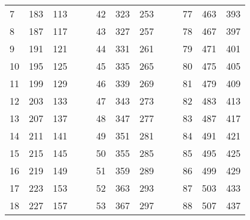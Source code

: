 \begin{table}[!h]
\begin{tabular}{|l|l|l|ll|l|l|l|lllll}
		7 & 183 & 113 &  &  & 42 & 323 & 253 &  & \multicolumn{1}{l|}{} & \multicolumn{1}{l|}{77} & \multicolumn{1}{l|}{463} & \multicolumn{1}{l|}{393} \\ \cline{1-3} \cline{6-8} \cline{11-13} 
		8 & 187 & 117 &  &  & 43 & 327 & 257 &  & \multicolumn{1}{l|}{} & \multicolumn{1}{l|}{78} & \multicolumn{1}{l|}{467} & \multicolumn{1}{l|}{397} \\ \cline{1-3} \cline{6-8} \cline{11-13} 
		9 & 191 & 121 &  &  & 44 & 331 & 261 &  & \multicolumn{1}{l|}{} & \multicolumn{1}{l|}{79} & \multicolumn{1}{l|}{471} & \multicolumn{1}{l|}{401} \\ \cline{1-3} \cline{6-8} \cline{11-13} 
		10 & 195 & 125 &  &  & 45 & 335 & 265 &  & \multicolumn{1}{l|}{} & \multicolumn{1}{l|}{80} & \multicolumn{1}{l|}{475} & \multicolumn{1}{l|}{405} \\ \cline{1-3} \cline{6-8} \cline{11-13} 
		11 & 199 & 129 &  &  & 46 & 339 & 269 &  & \multicolumn{1}{l|}{} & \multicolumn{1}{l|}{81} & \multicolumn{1}{l|}{479} & \multicolumn{1}{l|}{409} \\ \cline{1-3} \cline{6-8} \cline{11-13} 
		12 & 203 & 133 &  &  & 47 & 343 & 273 &  & \multicolumn{1}{l|}{} & \multicolumn{1}{l|}{82} & \multicolumn{1}{l|}{483} & \multicolumn{1}{l|}{413} \\ \cline{1-3} \cline{6-8} \cline{11-13} 
		13 & 207 & 137 &  &  & 48 & 347 & 277 &  & \multicolumn{1}{l|}{} & \multicolumn{1}{l|}{83} & \multicolumn{1}{l|}{487} & \multicolumn{1}{l|}{417} \\ \cline{1-3} \cline{6-8} \cline{11-13} 
		14 & 211 & 141 &  &  & 49 & 351 & 281 &  & \multicolumn{1}{l|}{} & \multicolumn{1}{l|}{84} & \multicolumn{1}{l|}{491} & \multicolumn{1}{l|}{421} \\ \cline{1-3} \cline{6-8} \cline{11-13} 
		15 & 215 & 145 &  &  & 50 & 355 & 285 &  & \multicolumn{1}{l|}{} & \multicolumn{1}{l|}{85} & \multicolumn{1}{l|}{495} & \multicolumn{1}{l|}{425} \\ \cline{1-3} \cline{6-8} \cline{11-13} 
		16 & 219 & 149 &  &  & 51 & 359 & 289 &  & \multicolumn{1}{l|}{} & \multicolumn{1}{l|}{86} & \multicolumn{1}{l|}{499} & \multicolumn{1}{l|}{429} \\ \cline{1-3} \cline{6-8} \cline{11-13} 
		17 & 223 & 153 &  &  & 52 & 363 & 293 &  & \multicolumn{1}{l|}{} & \multicolumn{1}{l|}{87} & \multicolumn{1}{l|}{503} & \multicolumn{1}{l|}{433} \\ \cline{1-3} \cline{6-8} \cline{11-13} 
		18 & 227 & 157 &  &  & 53 & 367 & 297 &  & \multicolumn{1}{l|}{} & \multicolumn{1}{l|}{88} & \multicolumn{1}{l|}{507} & \multicolumn{1}{l|}{437} \\ \cline{1-3} \cline{6-8} \cline{11-13} 

\end{tabular}
\end{table}
